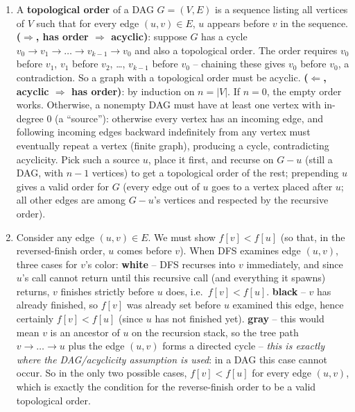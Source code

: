 \documentclass[11pt]{article}
\begin{document}
\begin{enumerate}[label=\textbf{A\arabic*.}, leftmargin=2.2em]
\item A \textbf{topological order} of a DAG $G=(V,E)$ is a sequence listing all vertices
of $V$ such that for every edge $(u,v) \in E$, $u$ appears before $v$ in the sequence.
\textbf{($\Rightarrow$, has order $\Rightarrow$ acyclic)}: suppose $G$ has a cycle $v_0
\to v_1 \to \dots \to v_{k-1} \to v_0$ and also a topological order. The order requires
$v_0$ before $v_1$, $v_1$ before $v_2$, \dots, $v_{k-1}$ before $v_0$ -- chaining these
gives $v_0$ before $v_0$, a contradiction. So a graph with a topological order must be
acyclic. \textbf{($\Leftarrow$, acyclic $\Rightarrow$ has order)}: by induction on $n =
|V|$. If $n=0$, the empty order works. Otherwise, a nonempty DAG must have at least one
vertex with in-degree 0 (a ``source''): otherwise every vertex has an incoming edge, and
following incoming edges backward indefinitely from any vertex must eventually repeat a
vertex (finite graph), producing a cycle, contradicting acyclicity. Pick such a source
$u$, place it first, and recurse on $G - u$ (still a DAG, with $n-1$ vertices) to get a
topological order of the rest; prepending $u$ gives a valid order for $G$ (every edge out
of $u$ goes to a vertex placed after $u$; all other edges are among $G-u$'s vertices and
respected by the recursive order).

\item Consider any edge $(u,v) \in E$. We must show $f[v] < f[u]$ (so that, in the
reversed-finish order, $u$ comes before $v$). When DFS examines edge $(u,v)$, three cases
for $v$'s color: \textbf{white} -- DFS recurses into $v$ immediately, and since $u$'s call
cannot return until this recursive call (and everything it spawns) returns, $v$ finishes
strictly before $u$ does, i.e.\ $f[v] < f[u]$. \textbf{black} -- $v$ has already finished,
so $f[v]$ was already set before $u$ examined this edge, hence certainly $f[v] < f[u]$
(since $u$ has not finished yet). \textbf{gray} -- this would mean $v$ is an ancestor of
$u$ on the recursion stack, so the tree path $v \to \dots \to u$ plus the edge $(u,v)$
forms a directed cycle -- \emph{this is exactly where the DAG/acyclicity assumption is
used}: in a DAG this case cannot occur. So in the only two possible cases, $f[v] < f[u]$
for every edge $(u,v)$, which is exactly the condition for the reverse-finish order to be
a valid topological order.


\end{enumerate}
\end{document}
